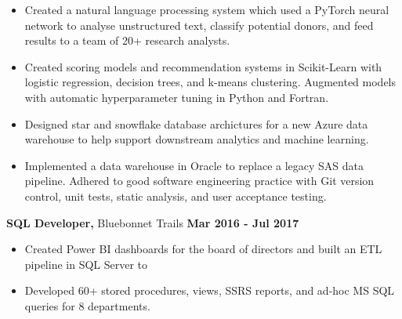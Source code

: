 \documentclass [
        11pt
] {article}
\begin{document}
\begin{itemize}[itemsep=1pt,topsep=1pt]
\renewcommand{\labelitemi}{\scriptsize$\blacksquare$}

\item Created a natural language processing system which used a PyTorch
neural network to analyse unstructured text, classify potential donors, and
feed results to a team of 20+ research analysts.

\item Created scoring models and recommendation systems in Scikit-Learn with
logistic regression, decision trees, and k-means clustering. Augmented models
with automatic hyperparameter tuning in Python and Fortran.

\item Designed star and snowflake database archictures for a new Azure data
warehouse to help support downstream analytics and machine learning.

\item Implemented a data warehouse in Oracle to replace a legacy SAS data
pipeline. Adhered to good software engineering practice with Git version control,
unit tests, static analysis, and user acceptance testing.

\end{itemize}

\vspace*{5pt}




\noindent \textbf{SQL Developer,} Bluebonnet Trails 
\hspace*{\fill} \textbf{Mar 2016 - Jul 2017}

\begin{itemize}[itemsep=1pt,topsep=1pt]
\renewcommand{\labelitemi}{\scriptsize$\blacksquare$}

\item Created Power BI dashboards for the board of directors
and built an ETL pipeline in SQL Server to 

\item Developed 60+ stored procedures, views, SSRS reports, and ad-hoc
MS SQL queries for 8 departments.

\end{itemize}

\vspace*{10pt}

\end{document}
